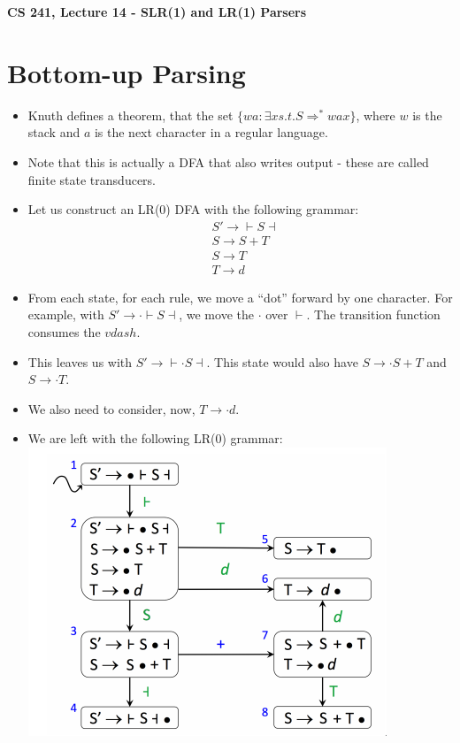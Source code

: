 \documentclass[12pt]{article}
\author{Clement Tsang}
\begin{document}
\begin{center}
    \Large\textbf{CS 241, Lecture 14 - SLR(1) and LR(1) Parsers}
\end{center}

\section{Bottom-up Parsing}
\begin{itemize}
    \item Knuth defines a theorem, that the set $\{wa: \exists x s.t. S \Rightarrow^* wax\}$, where $w$ is the stack and $a$ is the next character in a regular language.
    \item Note that this is actually a DFA that also writes output - these are called finite state transducers.
    \item Let us construct an LR(0) DFA with the following grammar:
        \begin{align*}
            &S' \rightarrow \vdash S \dashv \\
            &S \rightarrow S + T \\
            &S \rightarrow T \\
            &T \rightarrow d
        \end{align*}
    \item From each state, for each rule, we move a ``dot'' forward by one character.  For example, with $S' \rightarrow \cdot \vdash S \dashv$, we move the $\cdot$ over $\vdash$.  The transition function consumes the $vdash$.
    \item This leaves us with $S' \rightarrow \vdash \cdot S \dashv$.  This state would also have $S \rightarrow \cdot S + T$ and $S \rightarrow \cdot T$.  
    \item We also need to consider, now, $T \rightarrow \cdot d$.
    \item We are left with the following LR(0) grammar:\\
        \includegraphics[scale=0.7]{LRgrammar1.png}

\end{itemize}
\end{document}
